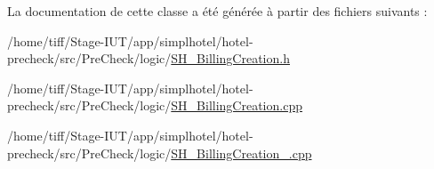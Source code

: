 La documentation de cette classe a été générée à partir des fichiers suivants \-:\begin{DoxyCompactItemize}
\item 
/home/tiff/\-Stage-\/\-I\-U\-T/app/simplhotel/hotel-\/precheck/src/\-Pre\-Check/logic/\hyperlink{SH__BillingCreation_8h}{S\-H\-\_\-\-Billing\-Creation.\-h}\item 
/home/tiff/\-Stage-\/\-I\-U\-T/app/simplhotel/hotel-\/precheck/src/\-Pre\-Check/logic/\hyperlink{SH__BillingCreation_8cpp}{S\-H\-\_\-\-Billing\-Creation.\-cpp}\item 
/home/tiff/\-Stage-\/\-I\-U\-T/app/simplhotel/hotel-\/precheck/src/\-Pre\-Check/logic/\hyperlink{SH__BillingCreation__0_8cpp}{S\-H\-\_\-\-Billing\-Creation\-\_.\-cpp}\end{DoxyCompactItemize}
